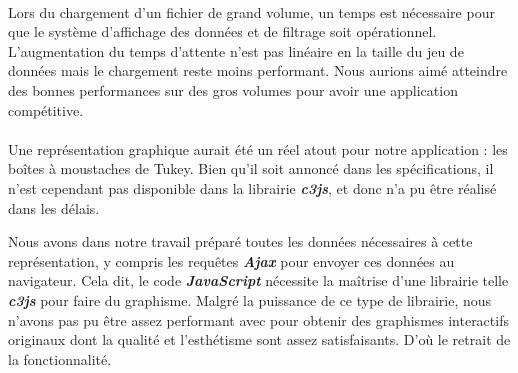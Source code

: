 				\paragraph{}Lors du chargement d'un fichier de grand volume, un temps est nécessaire pour que le système d'affichage des données et de filtrage soit opérationnel. L'augmentation du temps d'attente n'est pas linéaire en la taille du jeu de données mais le chargement reste moins performant. Nous aurions aimé atteindre des bonnes performances sur des gros volumes pour avoir une application compétitive.
				\paragraph{}Une représentation graphique aurait été un réel atout pour notre application : les boîtes à moustaches de Tukey.
				Bien qu'il soit annoncé dans les spécifications, il n'est cependant pas disponible dans la librairie \textit{\textbf{c3js}}, et donc n'a pu être réalisé dans les délais.
						
				Nous avons dans notre travail préparé toutes les données nécessaires à cette représentation, y compris les requêtes \textit{\textbf{Ajax}} pour envoyer ces données au navigateur. Cela dit, le code \textit{\textbf{JavaScript}} nécessite la maîtrise d'une librairie telle \textit{\textbf{c3js}} pour faire du graphisme. Malgré la puissance de ce type de librairie, nous n'avons pas pu être assez performant avec pour obtenir des graphismes interactifs originaux dont la qualité et l'esthétisme sont assez satisfaisants. D'où le retrait de la fonctionnalité.
		
				
